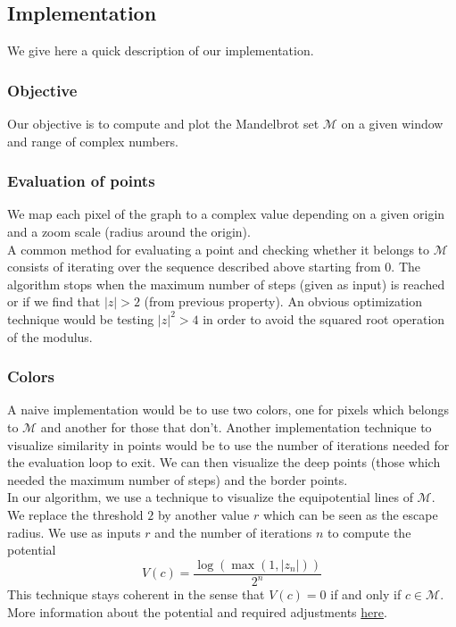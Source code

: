 \documentclass{article}
\begin{document}
\subsection{Implementation}
We give here a quick description of our implementation.

\subsubsection{Objective}
Our objective is to compute and plot the Mandelbrot set $\mathcal{M}$ on a given window and range of complex numbers.

\subsubsection{Evaluation of points}
We map each pixel of the graph to a complex value depending on a given origin and a zoom scale (radius around the origin).\\
A common method for evaluating a point and checking whether it belongs to $\mathcal{M}$ consists of iterating over the sequence described above starting from $0$. The algorithm stops when the maximum number of steps (given as input) is reached or if we find that $|z| > 2$ (from previous property). An obvious optimization technique would be testing $|z|^2 > 4$ in order to avoid the squared root operation of the modulus.

\subsubsection{Colors}
A naive implementation would be to use two colors, one for pixels which belongs to $\mathcal{M}$ and another for those that don't. Another implementation technique to visualize similarity in points would be to use the number of iterations needed for the evaluation loop to exit. We can then visualize the deep points (those which needed the maximum number of steps) and the border points.\\
In our algorithm, we use a technique to visualize the equipotential lines of $\mathcal{M}$.\\
We replace the threshold $2$ by another value $r$ which can be seen as the escape radius. We use as inputs $r$ and the number of iterations $n$ to compute the potential $$V(c) = \frac{\log (\max (1, |z_n|))}{2^n}$$
This technique stays coherent in the sense that $V(c) = 0$ if and only if $c \in \mathcal{M}$. More information about the potential and required adjustments \href{https://www.math.univ-toulouse.fr/~cheritat/wiki-draw/index.php/Mandelbrot_set#The_potential}{\color{blue}here}. 
\end{document}
